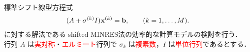 

標準シフト線型方程式
\begin{align}
	(A + \sigma^{(k)}I)\vb{x}^{(k)} = \vb{b}, \qquad (k=1,\dots,M).
	\label{eq-std-sls}
\end{align}
に対する解法である shifted MINRES法\cite{ref-S-HIDAKA-2025}の効率的な計算モデルの検討を行う．\\
行列 $A$ は\textcolor{red}{実対称}・\textcolor{red}{エルミート}行列で $\sigma_{k}$ は\textcolor{red}{複素数}，$I$ は\textcolor{red}{単位行列}であるとする．
